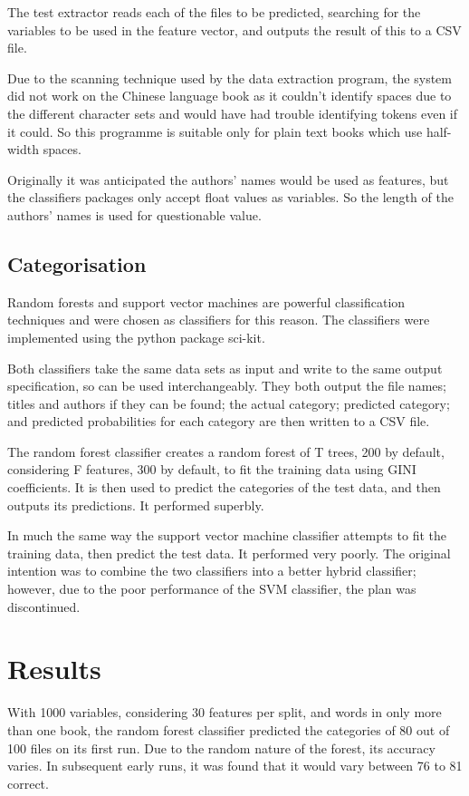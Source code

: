 \documentclass[11pt]{article}
\begin{document}
The test extractor reads each of the files to be predicted, searching for the
variables to be used in the feature vector, and outputs the result of this to a
CSV file.

Due to the scanning technique used by the data extraction program, the system
did not work on the Chinese language book as it couldn't identify spaces due to
the different character sets and would have had trouble identifying tokens even
if it could. So this programme is suitable only for plain text books which use
half-width spaces.

Originally it was anticipated the authors' names would be used as features, but
the classifiers packages only accept float values as variables. So the length of
the authors' names is used for questionable value.

\subsection{Categorisation}

Random forests and support vector machines are powerful classification
techniques and were chosen as classifiers for this reason. The classifiers were
implemented using the python package sci-kit.

Both classifiers take the same data sets as input and write to the same output
specification, so can be used interchangeably. They both output the file names;
titles and authors if they can be found; the actual category; predicted
category; and predicted probabilities for each category are then written to a
CSV file.

The random forest classifier creates a random forest of T trees, 200 by
default, considering F features, 300 by default, to fit the training data using
GINI coefficients. It is then used to predict the categories of the test data,
and then outputs its predictions. It performed superbly.

In much the same way the support vector machine classifier attempts to fit the
training data, then predict the test data. It performed very poorly. The
original intention was to combine the two classifiers into a better hybrid
classifier; however, due to the poor performance of the SVM classifier, the plan
was discontinued.

\section{Results}

With 1000 variables, considering 30 features per split, and words in only more
than one book, the random forest classifier predicted the categories of 80 out
of 100 files on its first run. Due to the random nature of the forest, its
accuracy varies. In subsequent early runs, it was found that it would vary
between 76 to 81 correct.
\end{document}

